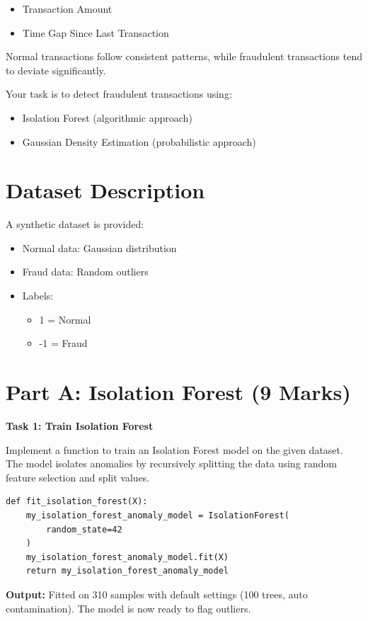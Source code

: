 \documentclass[12pt,a4paper]{article}
\begin{document}
\begin{itemize}
\item Transaction Amount
\item Time Gap Since Last Transaction
\end{itemize}

Normal transactions follow consistent patterns, while fraudulent transactions tend to deviate significantly.

Your task is to detect fraudulent transactions using:

\begin{itemize}
\item Isolation Forest (algorithmic approach)
\item Gaussian Density Estimation (probabilistic approach)
\end{itemize}


\section*{Dataset Description}

A synthetic dataset is provided:

\begin{itemize}
\item Normal data: Gaussian distribution
\item Fraud data: Random outliers
\item Labels:
    \begin{itemize}
    \item 1 = Normal
    \item -1 = Fraud
    \end{itemize}
\end{itemize}


\section*{Part A: Isolation Forest (9 Marks)}

\begin{tcolorbox}
\textbf{Task 1: Train Isolation Forest}

Implement a function to train an Isolation Forest model on the given dataset. 
The model isolates anomalies by recursively splitting the data using random 
feature selection and split values.

\begin{lstlisting}
def fit_isolation_forest(X):
    my_isolation_forest_anomaly_model = IsolationForest(
        random_state=42
    )
    my_isolation_forest_anomaly_model.fit(X)
    return my_isolation_forest_anomaly_model
\end{lstlisting}

\textbf{Output:} Fitted on 310 samples with default settings (100 trees, auto contamination). The model is now ready to flag outliers.

\end{tcolorbox}
\end{document}

